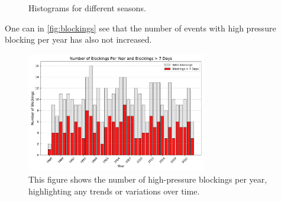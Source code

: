 \begin{figure}[H]
    \caption{Histograms for different seasons.}
    \label{fig:histograms}
\end{figure}
One can in \autoref{fig:blockings} see that the number of events with high pressure blocking per year has also not increased. 

\begin{figure}[H]
    \centering
    \includegraphics[width=0.7\textwidth]{Figures/BlockingsPerYear.pdf}
    \caption{This figure shows the number of high-pressure blockings per year, highlighting any trends or variations over time.}
    \label{fig:blockings}
\end{figure}




